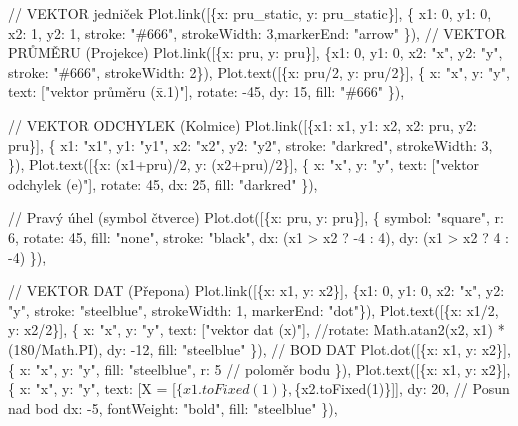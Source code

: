 \documentclass[
  czech,
  11pt,
  letterpaper,
  DIV=11,
  numbers=noendperiod]{scrreprt}
\newenvironment{Shaded}{\begin{snugshade}}{\end{snugshade}}
\newcommand{\NormalTok}[1]{\textcolor[rgb]{0.00,0.23,0.31}{#1}}
\newcounter{none} %
\begin{document}
\begin{tcolorbox}
\begin{Shaded}
\begin{Highlighting}[]
\NormalTok{    // VEKTOR jedniček}
\NormalTok{    Plot.link([\{x: pru\_static, y: pru\_static\}], \{}
\NormalTok{      x1: 0, y1: 0, x2: 1, y2: 1, }
\NormalTok{      stroke: "\#666", strokeWidth: 3,markerEnd: "arrow"}
\NormalTok{    \}),}
\NormalTok{    // VEKTOR PRŮMĚRU (Projekce)}
\NormalTok{    Plot.link([\{x: pru, y: pru\}], \{x1: 0, y1: 0, x2: "x", y2: "y", stroke: "\#666", strokeWidth: 2\}),}
\NormalTok{    Plot.text([\{x: pru/2, y: pru/2\}], \{}
\NormalTok{      x: "x", y: "y", text: ["vektor průměru (x̄.1)"], }
\NormalTok{      rotate: {-}45, dy: 15, fill: "\#666"}
\NormalTok{    \}),}
    
\NormalTok{    // VEKTOR ODCHYLEK (Kolmice)}
\NormalTok{    Plot.link([\{x1: x1, y1: x2, x2: pru, y2: pru\}], \{}
\NormalTok{      x1: "x1", y1: "y1", x2: "x2", y2: "y2", }
\NormalTok{      stroke: "darkred", strokeWidth: 3, }
\NormalTok{    \}),}
\NormalTok{    Plot.text([\{x: (x1+pru)/2, y: (x2+pru)/2\}], \{}
\NormalTok{      x: "x", y: "y", text: ["vektor odchylek (e)"], }
\NormalTok{      rotate: 45, dx: 25, fill: "darkred"}
\NormalTok{    \}),    }
    
\NormalTok{    // Pravý úhel (symbol čtverce)}
\NormalTok{    Plot.dot([\{x: pru, y: pru\}], \{}
\NormalTok{        symbol: "square", r: 6, rotate: 45, fill: "none", stroke: "black", }
\NormalTok{        dx: (x1 \textgreater{} x2 ? {-}4 : 4), dy: (x1 \textgreater{} x2 ? 4 : {-}4)}
\NormalTok{    \}),}

\NormalTok{    // VEKTOR DAT (Přepona)}
\NormalTok{    Plot.link([\{x: x1, y: x2\}], \{x1: 0, y1: 0, x2: "x", y2: "y", stroke: "steelblue", strokeWidth: 1, markerEnd: "dot"\}),}
\NormalTok{    Plot.text([\{x: x1/2, y: x2/2\}], \{}
\NormalTok{      x: "x", y: "y", text: ["vektor dat (x)"], }
\NormalTok{      //rotate: Math.atan2(x2, x1) * (180/Math.PI), }
\NormalTok{      dy: {-}12, fill: "steelblue"}
\NormalTok{    \}),}
\NormalTok{    // BOD DAT}
\NormalTok{    Plot.dot([\{x: x1, y: x2\}], \{}
\NormalTok{      x: "x", y: "y",}
\NormalTok{      fill: "steelblue",}
\NormalTok{      r: 5  // poloměr bodu}
\NormalTok{    \}),    }
\NormalTok{    Plot.text([\{x: x1, y: x2\}], \{}
\NormalTok{      x: "x", }
\NormalTok{      y: "y", }
\NormalTok{      text: [\textasciigrave{}X = [$\{x1.toFixed(1)\}, $\{x2.toFixed(1)\}]\textasciigrave{}], }
\NormalTok{      dy: 20,       // Posun nad bod}
\NormalTok{      dx: {-}5, }
\NormalTok{      fontWeight: "bold",}
\NormalTok{      fill: "steelblue"}
\NormalTok{    \}),}



\end{Highlighting}
\end{Shaded}
\end{tcolorbox}
\end{document}
